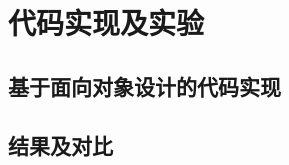 \documentclass{standalone}
\begin{document}
	
\chapter{代码实现及实验}
\section{基于面向对象设计的代码实现}
\section{结果及对比}
\subsection{}
\subsection{}
\subsection{}
\end{document}
